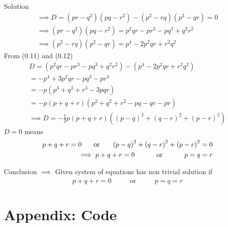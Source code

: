 \documentclass{beamer}
\numberwithin{equation}{section}
\providecommand{\brak}[1]{\ensuremath{\left(#1\right)}}
\theoremstyle{remark}
\begin{document}
\begin{frame}{Solution}
\begin{align}
\implies D=(pr-q^2)(pq-r^2)-(p^2-rq)(p^2-qr)=0\\
\implies (pr-q^2)(pq-r^2)=p^2qr-pr^3-pq^3+q^2r^2\\
\implies (p^2-rq)(p^2-qr)=p^4-2p^2qr+r^2q^2
\end{align}
From (0.11) and (0.12)
\begin{align}
    D=\brak{p^2qr-pr^3-pq^3+q^2r^2}-\brak{p^4-2p^2qr+r^2q^2}\\
    =-p^4+3p^2qr-pq^3-pr^3\\
    =-p\brak{p^3+q^3+r^3-3pqr}\\
    =-p\brak{p+q+r}\brak{p^2+q^2+r^2-pq-qr-pr}\\
 \implies D  =-\frac{1}{2}p\brak{p+q+r}\brak{\brak{p-q}^2 + \brak{q-r}^2 + \brak{p-r}^2}
\end{align}
$D=0$ means 
\begin{align}
    p+q+r=0 \hspace{0.5cm} \text{ or }\hspace{0.5cm} \brak{p-q}^2 + \brak{q-r}^2 + \brak{p-r}^2=0\\
    \implies  p+q+r=0 \hspace{1cm} \text{ or }\hspace{1cm} p=q=r
    \end{align}
\end{frame}

\begin{frame}{Conclusion}
 $\implies$ Given system of equations has non trivial solution if
 \begin{align}
     p+q+r=0 \hspace{1cm} \text{ or }\hspace{1cm} p=q=r
 \end{align}
\end{frame}


\section*{Appendix: Code}
\end{document}
